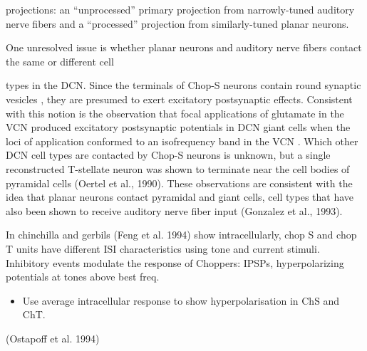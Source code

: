 \documentclass[10pt,a4paper]{article}
\begin{document}
projections: an ``unprocessed''
primary projection from narrowly-tuned auditory nerve fibers and a
``processed'' projection from similarly-tuned planar neurons.

One unresolved issue is whether planar neurons and auditory nerve fibers contact
the same or different cell

types in the DCN. Since the terminals of Chop-S neurons contain round synaptic
vesicles \citep{SmithRhode:1989}, they are presumed to exert excitatory
postsynaptic effects. Consistent with this notion is the observation that focal
applications of glutamate in the VCN produced excitatory postsynaptic potentials
in DCN giant cells when the loci of application conformed to an isofrequency
band in the VCN \citep{ZhangOertel:1993a}. Which other DCN cell types are
contacted by Chop-S neurons is unknown, but a single reconstructed T-stellate
neuron was shown to terminate near the cell bodies of pyramidal cells (Oertel et
al., 1990). These observations are consistent with the idea that planar neurons
contact pyramidal and giant cells, cell types that have also been shown to
receive auditory nerve fiber input (Gonzalez et al., 1993).

In chinchilla and gerbils (Feng et al. 1994) show intracellularly, chop S and
chop T units have different ISI characteristics using tone and current stimuli.
Inhibitory events modulate the response of Choppers: IPSPs, hyperpolarizing
potentials at tones above best freq.


\begin{itemize}
\item Use average intracellular response to show hyperpolarisation in ChS and
  ChT.
\end{itemize}

(Ostapoff et al. 1994)
\end{document}
